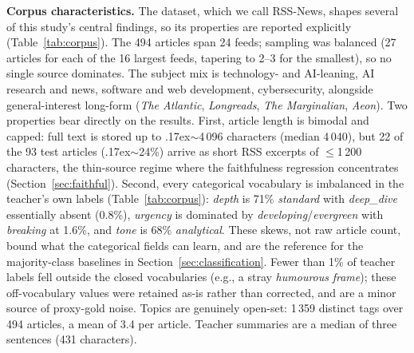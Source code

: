 \documentclass[10pt,journal]{IEEEtran}
\begin{document}
\textbf{Corpus characteristics.} The dataset, which we call RSS-News, shapes several of this study's central findings, so its properties are reported explicitly (Table~\ref{tab:corpus}). The 494 articles span 24 feeds; sampling was balanced (27 articles for each of the 16 largest feeds, tapering to 2--3 for the smallest), so no single source dominates. The subject mix is technology- and AI-leaning, AI research and news, software and web development, cybersecurity, alongside general-interest long-form (\emph{The Atlantic}, \emph{Longreads}, \emph{The Marginalian}, \emph{Aeon}). Two properties bear directly on the results. First, article length is bimodal and capped: full text is stored up to {\raise.17ex\hbox{$\scriptstyle\sim$}}4\,096 characters (median 4\,040), but 22 of the 93 test articles ({\raise.17ex\hbox{$\scriptstyle\sim$}}24\%) arrive as short RSS excerpts of $\leq$1\,200 characters, the thin-source regime where the faithfulness regression concentrates (Section~\ref{sec:faithful}). Second, every categorical vocabulary is imbalanced in the teacher's own labels (Table~\ref{tab:corpus}): \emph{depth} is 71\% \emph{standard} with \emph{deep\_dive} essentially absent (0.8\%), \emph{urgency} is dominated by \emph{developing}/\emph{evergreen} with \emph{breaking} at 1.6\%, and \emph{tone} is 68\% \emph{analytical}. These skews, not raw article count, bound what the categorical fields can learn, and are the reference for the majority-class baselines in Section~\ref{sec:classification}. Fewer than 1\% of teacher labels fell outside the closed vocabularies (e.g., a stray \emph{humourous} \emph{frame}); these off-vocabulary values were retained as-is rather than corrected, and are a minor source of proxy-gold noise. Topics are genuinely open-set: 1\,359 distinct tags over 494 articles, a mean of 3.4 per article. Teacher summaries are a median of three sentences (431 characters).
\end{document}
